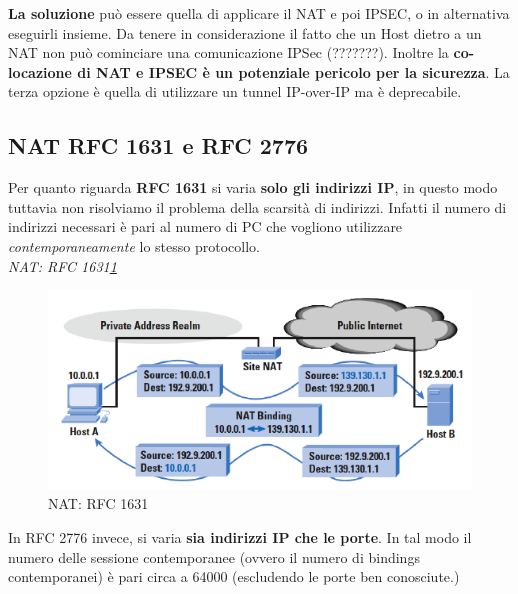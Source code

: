 \documentclass[12pt]{article}
\begin{document}
			\textbf{La soluzione} può essere quella di applicare il NAT e poi IPSEC, o in alternativa eseguirli insieme. Da tenere in considerazione il fatto che un Host dietro a un NAT non può cominciare una comunicazione IPSec (???????). Inoltre la \textbf{co-locazione di NAT e IPSEC è un potenziale pericolo per la sicurezza}. La terza opzione è quella di utilizzare un tunnel IP-over-IP ma è deprecabile.
		\subsection{NAT RFC 1631 e RFC 2776 }  
			Per quanto riguarda \textbf{RFC 1631} si varia \textbf{solo gli indirizzi IP}, in questo modo tuttavia non risolviamo il problema della scarsità di indirizzi. Infatti il numero di indirizzi necessari è pari al numero di PC che vogliono utilizzare \textit{contemporaneamente} lo stesso protocollo.\\
			\textit{NAT: RFC 1631\ref{fig:7}}\\
			\begin{figure}[h!]
				\centering
				\includegraphics[scale=0.60]{img/1631.PNG}
				\caption{NAT: RFC 1631\label{fig:7}}
			\end{figure}
			In RFC 2776 invece, si varia \textbf{sia indirizzi IP che le porte}. In tal modo il numero delle sessione contemporanee (ovvero il numero di bindings contemporanei) è pari circa a 64000 (escludendo le porte ben conosciute.)
\end{document}
